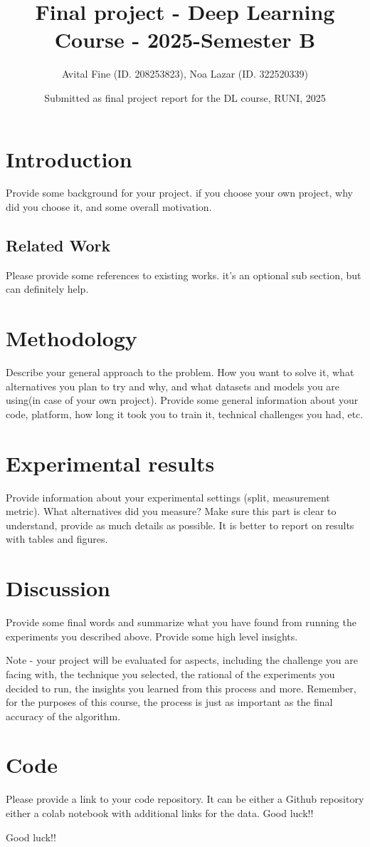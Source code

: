 \documentclass{article}
\title{Final project - Deep Learning Course - 2025-Semester B}
\author{Avital Fine (ID. 208253823), Noa Lazar (ID. 322520339)}
\date{Submitted as final project report for the DL course, RUNI, 2025}
\begin{document}
\maketitle

\section{Introduction}

Provide some background for your project. if you choose your own project, why did you choose it, and some overall motivation.

\subsection{Related Work}
Please provide some references to existing works. it's an optional sub section, but can definitely help.



\section{Methodology}
Describe your general approach to the problem. How you want to solve it, what alternatives you plan to try and why, and what datasets and models you are using(in case of your own project).
Provide some general information about your code, platform, how long it took you to train it, technical challenges you had, etc.

\section{Experimental results}
Provide information about your experimental settings (split, measurement metric). What alternatives did you measure? Make sure this part is clear to understand, provide as much details as possible. It is better to report on results with tables and figures.

\section{Discussion}
Provide some final words and summarize what you have found from running the experiments you described above. Provide some high level insights.

Note - your project will be evaluated for aspects, including the challenge you are facing with, the technique you selected, the rational of the experiments you decided to run, the insights you learned from this process and more. Remember, for the purposes of this course, the process is just as important as the final accuracy of the algorithm.

\section{Code}

Please provide a link to your code repository. It can be either a Github repository either a colab notebook with additional links for the data.
Good luck!!

Good luck!!


\end{document}
